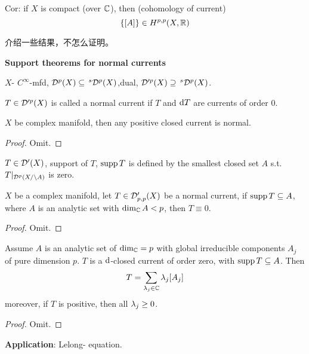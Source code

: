 Cor: if $X$ is compact (over $\mathbb{C}$), then (cohomology of current)
$$\{[A]\}\in H^{p,p}(X,\mathbb{R})$$


介绍一些结果，不怎么证明。

\textbf{Support theorems for normal currents}

$X$- $C^\infty$-mfd, $\mathcal{D}^p(X)\subseteq\,^s\mathcal{D}^p(X)$,dual,
$\mathcal{D}'^p(X)\supseteq\,^s\mathcal{D}^p(X)$.

\begin{definition}
$T\in\mathcal{D}'^p(X)$ is called a normal current if
$T$ and $\mathrm{d} T$ are currents of order $0$.
\end{definition}

\begin{example}
$X$ be complex manifold, then any positive closed current is normal.
\end{example}

\begin{proof}
  Omit.
\end{proof}

\begin{definition}
$T\in\mathcal{D}'(X)$, support of $T$, $\operatorname{supp} T$ is defined by the
smallest closed set $A$ s.t. $T|_{\mathcal{D}^p(X/\setminus A)}$ is zero.
\end{definition}

\begin{thm}$X$ be a complex manifold,
let $T\in\mathcal{D}_{p,p}'(X)$ be a normal current,
if $\operatorname{supp} T\subseteq A$, where $A$ is an analytic set with
$\dim_{\mathbb{C}}A<p$, then $T\equiv 0$.
\end{thm}

\begin{proof}
  Omit.
\end{proof}

\begin{thm}
Assume $A$ is an analytic set of $\dim_{\mathbb{C}}=p$
with global irreducible components $A_j$ of pure dimension $p$.
$T$ is a $\mathrm{d}$-closed current of order zero,
with $\operatorname{supp} T\subseteq A$. Then
$$
  T=\sum_{\lambda_j\in\mathbb{C}}
  \lambda_j[A_j]
$$
moreover, if $T$ is positive, then all $\lambda_j\geq 0$.
\end{thm}

\begin{proof}
  Omit.
\end{proof}

\textbf{Application}: Lelong-{\phjwll} equation.

